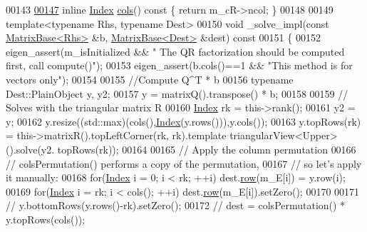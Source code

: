 \begin{DoxyCode}
00143     
\hyperlink{class_eigen_1_1_s_p_q_r_aa006d40963b05c7525b5ca0b02364d84}{00147}     \textcolor{keyword}{inline} \hyperlink{namespace_eigen_a62e77e0933482dafde8fe197d9a2cfde}{Index} \hyperlink{class_eigen_1_1_s_p_q_r_aa006d40963b05c7525b5ca0b02364d84}{cols}()\textcolor{keyword}{ const }\{ \textcolor{keywordflow}{return} m\_cR->ncol; \}
00148     
00149     \textcolor{keyword}{template}<\textcolor{keyword}{typename} Rhs, \textcolor{keyword}{typename} Dest>
00150     \textcolor{keywordtype}{void} \_solve\_impl(\textcolor{keyword}{const} \hyperlink{group___core___module_class_eigen_1_1_matrix_base}{MatrixBase<Rhs>} &b, \hyperlink{group___core___module_class_eigen_1_1_matrix_base}{MatrixBase<Dest>} &dest)\textcolor{keyword}{ const}
00151 \textcolor{keyword}{    }\{
00152       eigen\_assert(m\_isInitialized && \textcolor{stringliteral}{" The QR factorization should be computed first, call compute()"});
00153       eigen\_assert(b.cols()==1 && \textcolor{stringliteral}{"This method is for vectors only"});
00154 
00155       \textcolor{comment}{//Compute Q^T * b}
00156       \textcolor{keyword}{typename} Dest::PlainObject y, y2;
00157       y = matrixQ().transpose() * b;
00158       
00159       \textcolor{comment}{// Solves with the triangular matrix R}
00160       \hyperlink{namespace_eigen_a62e77e0933482dafde8fe197d9a2cfde}{Index} rk = this->rank();
00161       y2 = y;
00162       y.resize((std::max)(cols(),\hyperlink{namespace_eigen_a62e77e0933482dafde8fe197d9a2cfde}{Index}(y.rows())),y.cols());
00163       y.topRows(rk) = this->matrixR().topLeftCorner(rk, rk).template triangularView<Upper>().solve(y2.
      topRows(rk));
00164 
00165       \textcolor{comment}{// Apply the column permutation }
00166       \textcolor{comment}{// colsPermutation() performs a copy of the permutation,}
00167       \textcolor{comment}{// so let's apply it manually:}
00168       \textcolor{keywordflow}{for}(\hyperlink{namespace_eigen_a62e77e0933482dafde8fe197d9a2cfde}{Index} i = 0; i < rk; ++i) dest.\hyperlink{group___core___module_a4ea11afe36c7962c706caa93decd1380}{row}(m\_E[i]) = y.row(i);
00169       \textcolor{keywordflow}{for}(\hyperlink{namespace_eigen_a62e77e0933482dafde8fe197d9a2cfde}{Index} i = rk; i < cols(); ++i) dest.\hyperlink{group___core___module_a4ea11afe36c7962c706caa93decd1380}{row}(m\_E[i]).setZero();
00170       
00171 \textcolor{comment}{//       y.bottomRows(y.rows()-rk).setZero();}
00172 \textcolor{comment}{//       dest = colsPermutation() * y.topRows(cols());}

\end{DoxyCode}
